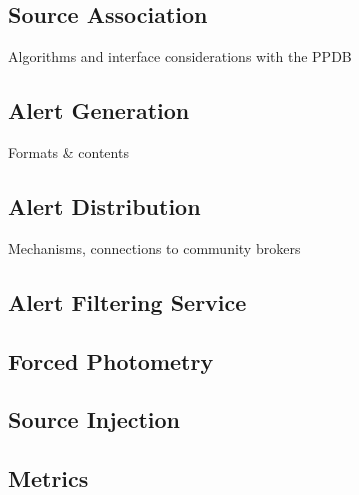 
\subsection{Source Association}

Algorithms and interface considerations with the PPDB


\subsection{Alert Generation}

Formats \& contents

\subsection{Alert Distribution}

Mechanisms, connections to community brokers

\subsection{Alert Filtering Service}

\subsection{Forced Photometry}

\subsection{Source Injection}

\subsection{Metrics}